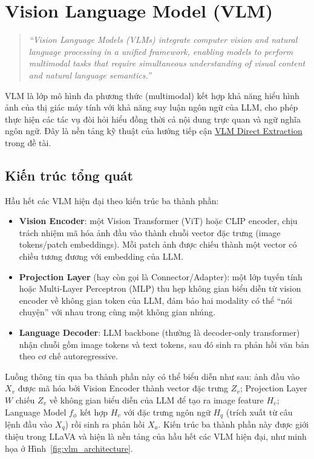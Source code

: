﻿\documentclass[12pt]{report}
\begin{document}
\section{Vision Language Model (VLM)}\label{sec:vlm}

\begin{quote}
\emph{``Vision Language Models (VLMs) integrate computer vision and natural language processing in a unified framework, enabling models to perform multimodal tasks that require simultaneous understanding of visual content and natural language semantics.''} \cite{vlmsurvey2025}
\end{quote}

VLM là lớp mô hình đa phương thức (multimodal) kết hợp khả năng hiểu hình ảnh của thị giác máy tính với khả năng suy luận ngôn ngữ của LLM, cho phép thực hiện các tác vụ đòi hỏi hiểu đồng thời cả nội dung trực quan và ngữ nghĩa ngôn ngữ. Đây là nền tảng kỹ thuật của hướng tiếp cận \hyperref[sec:vlm_pipeline]{VLM Direct Extraction} trong đề tài.

\subsection{Kiến trúc tổng quát}\label{sec:vlm_architecture}

Hầu hết các VLM hiện đại theo kiến trúc ba thành phần:

\begin{itemize}
    \item \textbf{Vision Encoder}: một Vision Transformer (ViT) hoặc CLIP encoder, chịu trách nhiệm mã hóa ảnh đầu vào thành chuỗi vector đặc trưng (image tokens/patch embeddings). Mỗi patch ảnh được chiếu thành một vector có chiều tương đương với embedding của LLM.
    \item \textbf{Projection Layer} (hay còn gọi là Connector/Adapter): một lớp tuyến tính hoặc Multi-Layer Perceptron (MLP) thu hẹp không gian biểu diễn từ vision encoder về không gian token của LLM, đảm bảo hai modality có thể ``nói chuyện'' với nhau trong cùng một không gian nhúng.
    \item \textbf{Language Decoder}: LLM backbone (thường là decoder-only transformer) nhận chuỗi gồm image tokens và text tokens, sau đó sinh ra phản hồi văn bản theo cơ chế autoregressive.
\end{itemize}

Luồng thông tin qua ba thành phần này có thể biểu diễn như sau: ảnh đầu vào $X_v$ được mã hóa bởi Vision Encoder thành vector đặc trưng $Z_v$; Projection Layer $W$ chiếu $Z_v$ về không gian biểu diễn của LLM để tạo ra image feature $H_v$; Language Model $f_\phi$ kết hợp $H_v$ với đặc trưng ngôn ngữ $H_q$ (trích xuất từ câu lệnh đầu vào $X_q$) rồi sinh ra phản hồi $X_a$. Kiến trúc ba thành phần này được giới thiệu trong LLaVA \cite{liu2023llava} và hiện là nền tảng của hầu hết các VLM hiện đại, như minh họa ở Hình~\ref{fig:vlm_architecture}.
\end{document}
